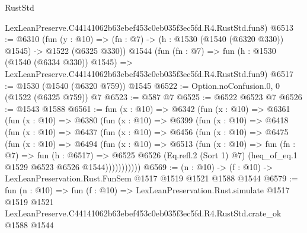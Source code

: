 \begin{lexlean}{RustStd}
\begin{coremodule}
    LexLeanPreserve.C44141062b63ebef453c0eb035f3ec5fd.R4.RustStd.fun8)
@6513 := @6310
    (fun (y : @10) => (fn : @7) -> (h : @1530 (@1540 (@6320 @330)) @1545) -> @1522 (@6325 @330))
    @1544
    (fun (fn : @7) =>
    fun (h : @1530 (@1540 (@6334 @330)) @1545) =>
    LexLeanPreserve.C44141062b63ebef453c0eb035f3ec5fd.R4.RustStd.fun9)
@6517 := @1530 (@1540 (@6320 @759)) @1545
@6522 := Option.noConfusion.{0, 0} (@1522 (@6325 @759)) @7
@6523 := @587 @7
@6525 := @6522 @6523 @7
@6526 := @1543 @1588
@6561 := fun (x : @10) =>
  @6342
    (fun (x : @10) =>
    @6361
      (fun (x : @10) =>
      @6380
        (fun (x : @10) =>
        @6399
          (fun (x : @10) =>
          @6418
            (fun (x : @10) =>
            @6437
              (fun (x : @10) =>
              @6456
                (fun (x : @10) =>
                @6475
                  (fun (x : @10) =>
                  @6494
                    (fun (x : @10) =>
                    @6513
                      (fun (x : @10) =>
                      fun (fn : @7) =>
                      fun (h : @6517) =>
                      @6525
                        @6526
                        (Eq.refl.{2} (Sort 1) @7)
                        (heq_of_eq.{1} @1529 @6523 @6526 @1544)))))))))))
@6569 := (n : @10) -> (f : @10) -> LexLeanPreservation.Rust.FunSem @1517 @1519 @1521 @1588 @1544
@6579 := fun (n : @10) =>
  fun (f : @10) =>
  LexLeanPreservation.Rust.simulate
    @1517
    @1519
    @1521
    LexLeanPreserve.C44141062b63ebef453c0eb035f3ec5fd.R4.RustStd.crate_ok
    @1588
    @1544
\end{coremodule}
\end{lexlean}
